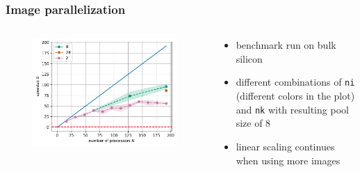 \documentclass[aspectratio=169]{beamer}
\begin{document}
%
%
%

\begin{frame}
	\frametitle{Image parallelization}

	\begin{columns}
		\begin{column}{0.5\textwidth}
			\begin{figure}
				\includegraphics[width=\textwidth]{figs/si_ph_poolsize_8_bench_ni_speedup.pdf}
			\end{figure}
		\end{column}

		\begin{column}{0.5\textwidth}
			\begin{itemize}
				\item benchmark run on bulk silicon
				\item different combinations of \texttt{ni} (different colors in the plot) and \texttt{nk} with resulting pool size of 8
				\item linear scaling continues when using more images
			\end{itemize}
		\end{column}
	\end{columns}

\end{frame}
\end{document}
